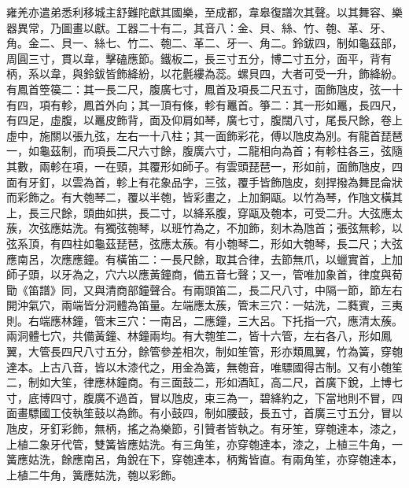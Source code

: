 \begin{pinyinscope}
 雍羌亦遣弟悉利移城主舒難陀獻其國樂，至成都，韋皋復譜次其聲。以其舞容、樂器異常，乃圖畫以獻。工器二十有二，其音八：金、貝、絲、竹、匏、革、牙、角。金二、貝一、絲七、竹二、匏二、革二、牙一、角二。鈴鈸四，制如龜茲部，周圓三寸，貫以韋，擊磕應節。鐵板二，長三寸五分，博二寸五分，面平，背有柄，系以韋，與鈴鈸皆飾絳紛，以花氎縷為蕊。螺貝四，大者可受一升，飾絳紛。有鳳首箜篌二：其一長二尺，腹廣七寸，鳳首及項長二尺五寸，面飾虺皮，弦一十有四，項有軫，鳳首外向；其一頂有條，軫有鼉首。箏二：其一形如鼉，長四尺，有四足，虛腹，以鼉皮飾背，面及仰肩如琴，廣七寸，腹闊八寸，尾長尺餘，卷上虛中，施關以張九弦，左右一十八柱；其一面飾彩花，傅以虺皮為別。有龍首琵琶一，如龜茲制，而項長二尺六寸餘，腹廣六寸，二龍相向為首；有軫柱各三，弦隨其數，兩軫在項，一在頸，其覆形如師子。有雲頭琵琶一，形如前，面飾虺皮，四面有牙釘，以雲為首，軫上有花象品字，三弦，覆手皆飾虺皮，刻捍撥為舞昆侖狀而彩飾之。有大匏琴二，覆以半匏，皆彩畫之，上加銅甌。以竹為琴，作虺文橫其上，長三尺餘，頭曲如拱，長二寸，以絳系腹，穿甌及匏本，可受二升。大弦應太蔟，次弦應姑洗。有獨弦匏琴，以班竹為之，不加飾，刻木為虺首；張弦無軫，以弦系頂，有四柱如龜茲琵琶，弦應太蔟。有小匏琴二，形如大匏琴，長二尺；大弦應南呂，次應應鐘。有橫笛二：一長尺餘，取其合律，去節無爪，以蠟實首，上加師子頭，以牙為之，穴六以應黃鐘商，備五音七聲；又一，管唯加象首，律度與荀勖《笛譜》同，又與清商部鐘聲合。有兩頭笛二，長二尺八寸，中隔一節，節左右開沖氣穴，兩端皆分洞體為笛量。左端應太蔟，管末三穴：一姑洗，二蕤賓，三夷則。右端應林鐘，管末三穴：一南呂，二應鐘，三大呂。下托指一穴，應清太蔟。兩洞體七穴，共備黃鐘、林鐘兩均。有大匏笙二，皆十六管，左右各八，形如鳳翼，大管長四尺八寸五分，餘管參差相次，制如笙管，形亦類鳳翼，竹為簧，穿匏達本。上古八音，皆以木漆代之，用金為簧，無匏音，唯驃國得古制。又有小匏笙二，制如大笙，律應林鐘商。有三面鼓二，形如酒缸，高二尺，首廣下銳，上博七寸，底博四寸，腹廣不過首，冒以虺皮，束三為一，碧絳約之，下當地則不冒，四面畫驃國工伎執笙鼓以為飾。有小鼓四，制如腰鼓，長五寸，首廣三寸五分，冒以虺皮，牙釘彩飾，無柄，搖之為樂節，引贊者皆執之。有牙笙，穿匏達本，漆之，上植二象牙代管，雙簧皆應姑洗。有三角笙，亦穿匏達本，漆之，上植三牛角，一簧應姑洗，餘應南呂，角銳在下，穿匏達本，柄觜皆直。有兩角笙，亦穿匏達本，上植二牛角，簧應姑洗，匏以彩飾。




\end{pinyinscope}
